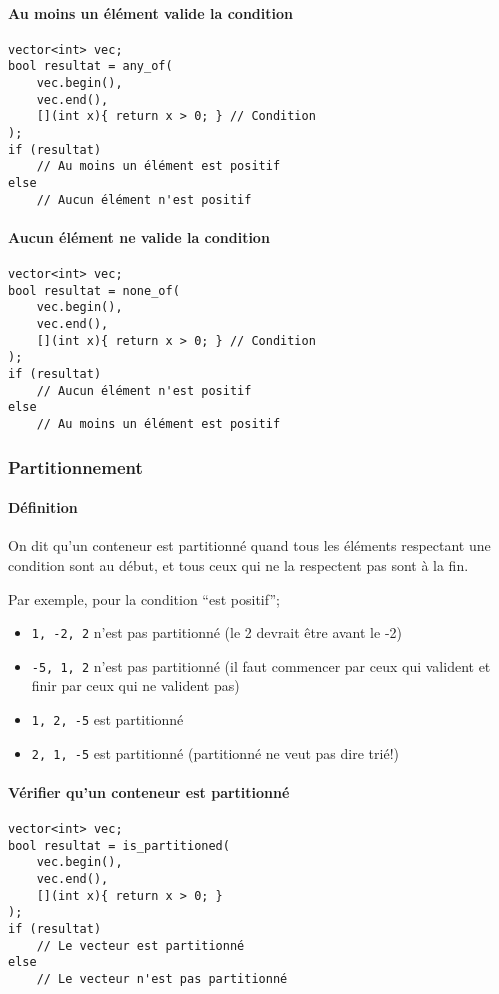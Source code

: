 \documentclass[10pt,a4paper,french]{article}
\begin{document}
\paragraph{Au moins un élément valide la condition}
\begin{verbatim}
vector<int> vec;
bool resultat = any_of(
    vec.begin(),
    vec.end(),
    [](int x){ return x > 0; } // Condition
);
if (resultat)
    // Au moins un élément est positif
else
    // Aucun élément n'est positif
\end{verbatim}

\paragraph{Aucun élément ne valide la condition}
\begin{verbatim}
vector<int> vec;
bool resultat = none_of(
    vec.begin(),
    vec.end(),
    [](int x){ return x > 0; } // Condition
);
if (resultat)
    // Aucun élément n'est positif
else
    // Au moins un élément est positif
\end{verbatim}

\subsubsection{Partitionnement}

\paragraph{Définition}
On dit qu'un conteneur est partitionné quand tous les éléments respectant une condition sont au début, et tous ceux qui ne la respectent pas sont à la fin.

Par exemple, pour la condition ``est positif'';
\begin{itemize}
\item {\tt 1, -2, 2} n'est pas partitionné (le 2 devrait être avant le -2)
\item {\tt -5, 1, 2} n'est pas partitionné (il faut commencer par ceux qui valident et finir par ceux qui ne valident pas)
\item {\tt 1, 2, -5} est partitionné
\item {\tt 2, 1, -5} est partitionné (partitionné ne veut pas dire trié!)
\end{itemize}

\paragraph{Vérifier qu'un conteneur est partitionné}
\begin{verbatim}
vector<int> vec;
bool resultat = is_partitioned(
    vec.begin(),
    vec.end(),
    [](int x){ return x > 0; }
);
if (resultat)
    // Le vecteur est partitionné
else
    // Le vecteur n'est pas partitionné
\end{verbatim}
\end{document}
